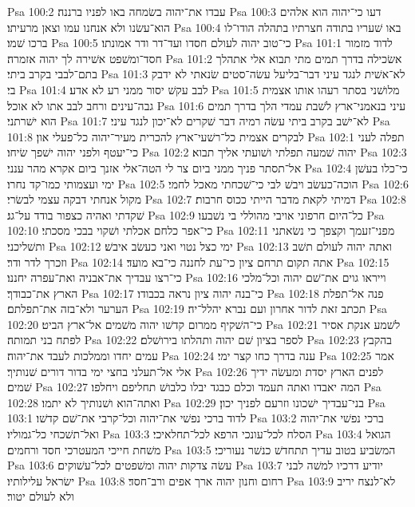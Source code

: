 Psa 100:2  עבדו את־יהוה בשׂמחה באו לפניו ברננה׃
Psa 100:3  דעו כי־יהוה הוא אלהים הוא־עשׂנו ולא אנחנו עמו וצאן מרעיתו׃
Psa 100:4  באו שׁעריו בתודה חצרתיו בתהלה הודו־לו ברכו שׁמו׃
Psa 100:5  כי־טוב יהוה לעולם חסדו ועד־דר ודר אמונתו׃
Psa 101:1  לדוד מזמור חסד־ומשׁפט אשׁירה לך יהוה אזמרה׃
Psa 101:2  אשׂכילה בדרך תמים מתי תבוא אלי אתהלך בתם־לבבי בקרב ביתי׃
Psa 101:3  לא־אשׁית לנגד עיני דבר־בליעל עשׂה־סטים שׂנאתי לא ידבק בי׃
Psa 101:4  לבב עקשׁ יסור ממני רע לא אדע׃
Psa 101:5  מלושׁני בסתר רעהו אותו אצמית גבה־עינים ורחב לבב אתו לא אוכל׃
Psa 101:6  עיני בנאמני־ארץ לשׁבת עמדי הלך בדרך תמים הוא ישׁרתני׃
Psa 101:7  לא־ישׁב בקרב ביתי עשׂה רמיה דבר שׁקרים לא־יכון לנגד עיני׃
Psa 101:8  לבקרים אצמית כל־רשׁעי־ארץ להכרית מעיר־יהוה כל־פעלי און׃
Psa 102:1  תפלה לעני כי־יעטף ולפני יהוה ישׁפך שׂיחו׃
Psa 102:2  יהוה שׁמעה תפלתי ושׁועתי אליך תבוא׃
Psa 102:3  אל־תסתר פניך ממני ביום צר לי הטה־אלי אזנך ביום אקרא מהר ענני׃
Psa 102:4  כי־כלו בעשׁן ימי ועצמותי כמו־קד נחרו׃
Psa 102:5  הוכה־כעשׂב ויבשׁ לבי כי־שׁכחתי מאכל לחמי׃
Psa 102:6  מקול אנחתי דבקה עצמי לבשׂרי׃
Psa 102:7  דמיתי לקאת מדבר הייתי ככוס חרבות׃
Psa 102:8  שׁקדתי ואהיה כצפור בודד על־גג׃
Psa 102:9  כל־היום חרפוני אויבי מהוללי בי נשׁבעו׃
Psa 102:10  כי־אפר כלחם אכלתי ושׁקוי בבכי מסכתי׃
Psa 102:11  מפני־זעמך וקצפך כי נשׂאתני ותשׁליכני׃
Psa 102:12  ימי כצל נטוי ואני כעשׂב איבשׁ׃
Psa 102:13  ואתה יהוה לעולם תשׁב וזכרך לדר ודר׃
Psa 102:14  אתה תקום תרחם ציון כי־עת לחננה כי־בא מועד׃
Psa 102:15  כי־רצו עבדיך את־אבניה ואת־עפרה יחננו׃
Psa 102:16  וייראו גוים את־שׁם יהוה וכל־מלכי הארץ את־כבודך׃
Psa 102:17  כי־בנה יהוה ציון נראה בכבודו׃
Psa 102:18  פנה אל־תפלת הערער ולא־בזה את־תפלתם׃
Psa 102:19  תכתב זאת לדור אחרון ועם נברא יהלל־יה׃
Psa 102:20  כי־השׁקיף ממרום קדשׁו יהוה משׁמים אל־ארץ הביט׃
Psa 102:21  לשׁמע אנקת אסיר לפתח בני תמותה׃
Psa 102:22  לספר בציון שׁם יהוה ותהלתו בירושׁלם׃
Psa 102:23  בהקבץ עמים יחדו וממלכות לעבד את־יהוה׃
Psa 102:24  ענה בדרך כחו קצר ימי׃
Psa 102:25  אמר אלי אל־תעלני בחצי ימי בדור דורים שׁנותיך׃
Psa 102:26  לפנים הארץ יסדת ומעשׂה ידיך שׁמים׃
Psa 102:27  המה יאבדו ואתה תעמד וכלם כבגד יבלו כלבושׁ תחליפם ויחלפו׃
Psa 102:28  ואתה־הוא ושׁנותיך לא יתמו׃
Psa 102:29  בני־עבדיך ישׁכונו וזרעם לפניך יכון׃
Psa 103:1  לדוד ברכי נפשׁי את־יהוה וכל־קרבי את־שׁם קדשׁו׃
Psa 103:2  ברכי נפשׁי את־יהוה ואל־תשׁכחי כל־גמוליו׃
Psa 103:3  הסלח לכל־עונכי הרפא לכל־תחלאיכי׃
Psa 103:4  הגואל משׁחת חייכי המעטרכי חסד ורחמים׃
Psa 103:5  המשׂביע בטוב עדיך תתחדשׁ כנשׁר נעוריכי׃
Psa 103:6  עשׂה צדקות יהוה ומשׁפטים לכל־עשׁוקים׃
Psa 103:7  יודיע דרכיו למשׁה לבני ישׂראל עלילותיו׃
Psa 103:8  רחום וחנון יהוה ארך אפים ורב־חסד׃
Psa 103:9  לא־לנצח יריב ולא לעולם יטור׃
